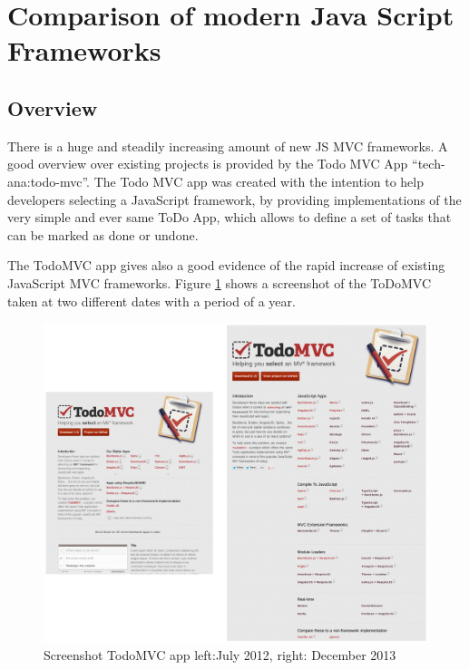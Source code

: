 \section{Comparison of modern Java Script Frameworks}

\subsection{Overview}

There is a huge and steadily increasing amount of new JS MVC frameworks.
A good overview over existing projects is provided by the Todo MVC App \enquote{tech-ana:todo-mvc}.
The Todo MVC app was created with the intention to help developers selecting a JavaScript framework, by providing implementations of the very simple and ever same ToDo App, which allows to define a set of tasks that can be marked as done or undone.


The TodoMVC app gives also a good evidence of the rapid increase of existing JavaScript MVC frameworks.
Figure \ref{fig:todoMvcComp} shows a screenshot of the ToDoMVC taken at two different dates with a period of a year.

\begin{figure}
	\centering	\includegraphics[width=1.0\textwidth]{./img/tech-ana/todo_mvc_app_comparison.png}
	\caption{Screenshot TodoMVC app left:July 2012, right: December 2013}
	\label{fig:todoMvcComp}
\end{figure}


